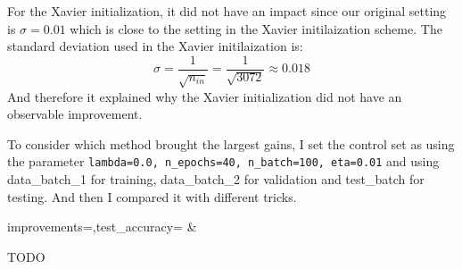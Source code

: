 \documentclass[12pt]{article}
\begin{document}
For the Xavier initialization, it did not have an impact since our original
setting is $\sigma = 0.01$ which is close to the setting in the Xavier initilaization
scheme. The standard deviation used in the Xavier initilaization is:
\begin{equation*}
    \sigma = \frac{1}{\sqrt{n_{in}}} = \frac{1}{\sqrt{3072}} \approx 0.018
\end{equation*}
And therefore it explained why the Xavier initialization did not have an observable
improvement.

To consider which method brought the largest gains, I set the control set as using
the parameter
\texttt{lambda=0.0, n\_epochs=40, n\_batch=100, eta=0.01} and using data\_batch\_1
for training, data\_batch\_2 for validation and test\_batch for testing.
And then I compared it with different tricks.

\begin{table}
    \centering
    {improvements=\improve,test_accuracy=\testAcc}
    {\improve & \testAcc}
    \caption{TODO}
\end{table}
\end{document}
